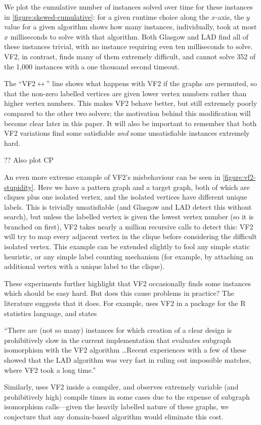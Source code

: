 \documentclass[twoside,11pt]{article}
\newcommand{\citet}[1]{\citeA{#1}}
\begin{document}
We plot the cumulative number of instances solved over time for these instances in
\cref{figure:skewed-cumulative}: for a given runtime choice along the $x$-axis, the $y$ value for a
given algorithm shows how many instances, individually, took at most $x$ milliseconds to solve with
that algorithm. Both Glasgow and LAD find all of these instances trivial, with no instance requiring
even ten milliseconds to solve. VF2, in contrast, finds many of them extremely difficult, and cannot
solve 352 of the 1,000 instances with a one thousand second timeout.

The ``VF2${\leftrightarrow}$'' line shows what happens with VF2 if the graphs are permuted, so that
the non-zero labelled vertices are given lower vertex numbers rather than higher vertex numbers.
This makes VF2 behave better, but still extremely poorly compared to the other two solvers; the
motivation behind this modification will become clear later in this paper.  It will also be
important to remember that both VF2 variations find some satisfiable \emph{and} some unsatisfiable
instances extremely hard.

?? Also plot CP

An even more extreme example of VF2's misbehaviour can be seen in \cref{figure:vf2-stupidity}. Here
we have a pattern graph and a target graph, both of which are cliques plus one isolated vertex, and
the isolated vertices have different unique labels. This is trivially unsatisfiable (and Glasgow and
LAD detect this without search), but unless the labelled vertex is given the lowest vertex number
(so it is branched on first), VF2 takes nearly a million recursive calls to detect this: VF2 will
try to map every adjacent vertex in the clique before considering the difficult isolated vertex.
This example can be extended slightly to fool any simple static heuristic, or any simple label
counting mechanism (for example, by attaching an additional vertex with a unique label to the
clique).

These experiments further highlight that VF2 occasionally finds some instances which should be easy hard.
But does this cause problems in practice? The literature suggests that it does. For example,
\citet{o:Gromping14} uses VF2 in a package for the R statistics language, and states
\begin{displayquote}``There are (not so many) instances for which creation of a clear design is
    prohibitively slow in the current implementation that evaluates subgraph isomorphism with the
    VF2 algorithm \ldots Recent experiences with a few of these showed that the LAD algorithm was
    very fast in ruling out impossible matches, where VF2 took a long time.''\end{displayquote}
Similarly, \citet{o:Murray12} uses VF2 inside a compiler, and observes extremely variable
(and prohibitively high) compile times in some cases due to the expense of subgraph isomorphism
calls---given the heavily labelled nature of these graphs, we conjecture that any domain-based
algorithm would eliminate this cost.
\end{document}
